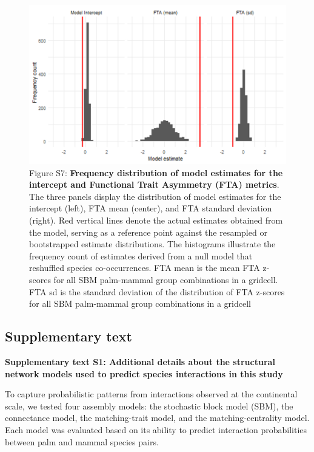 \documentclass[
]{agujournal2019}
\begin{document}
\begin{figure}[H]

{\centering \includegraphics{Sup_figures/00_simulations_estimates.png}

}

\caption{Figure S7: \textbf{Frequency distribution of model estimates
for the intercept and Functional Trait Asymmetry (FTA) metrics}. The
three panels display the distribution of model estimates for the
intercept (left), FTA mean (center), and FTA standard deviation (right).
Red vertical lines denote the actual estimates obtained from the model,
serving as a reference point against the resampled or bootstrapped
estimate distributions. The histograms illustrate the frequency count of
estimates derived from a null model that reshuffled species
co-occurrences. FTA mean is the mean FTA z-scores for all SBM
palm-mammal group combinations in a gridcell. FTA sd is the standard
deviation of the distribution of FTA z-scores for all SBM palm-mammal
group combinations in a gridcell}

\end{figure}%

\subsection{Supplementary text}\label{supplementary-text}

\textbf{Supplementary text S1: Additional details about the structural
network models used to predict species interactions in this study}

To capture probabilistic patterns from interactions observed at the
continental scale, we tested four assembly models: the stochastic block
model (SBM), the connectance model, the matching-trait model, and the
matching-centrality model. Each model was evaluated based on its ability
to predict interaction probabilities between palm and mammal species
pairs.
\end{document}
